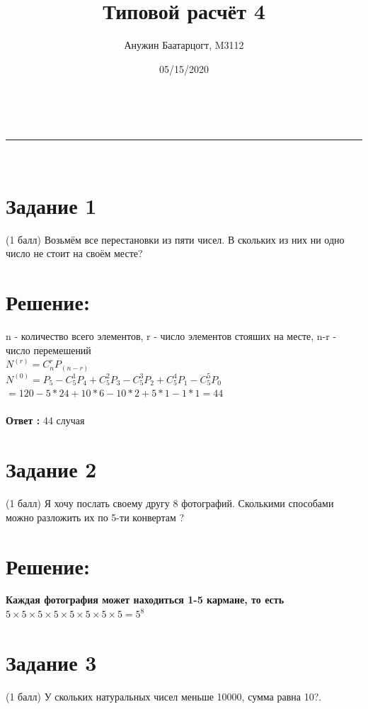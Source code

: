 \documentclass[a4paper,11pt]{article}
\makeatletter
\newcommand{\linia}{\rule{\linewidth}{0.5pt}}
\theoremstyle{mytheor}
\renewcommand{\maketitle}{
\begin{center}
\vspace{2ex}
{\huge \textsc{\@title}}
\vspace{1ex}
\\
\linia\\
\@author \hfill \@date
\vspace{4ex}
\end{center}
}
\makeatother
\begin{document}
\title{Типовой расчёт \textnumero{} 4}

\author{Анужин Баатарцогт, M3112}

\date{05/15/2020}

\maketitle

\section*{Задание 1}
(1 балл) Возьмём все перестановки из пяти чисел. В скольких из них ни одно число не стоит на своём месте?
\newline
\section*{Решение:}
n - количество всего элементов, r - число элементов стояших на месте, n-r - число перемешений \\
$N^{(r)} = C_n^r  P_(n-r)$  \\
$N^{(0)} = P_5 - C_5^1P_4 + C_5^2P_3 - C_5^3P_2 + C_5^4P_1 - C_5^5P_0$
$ = 120 -5*24 + 10*6 - 10*2 + 5*1 - 1*1 = 44$\\ \\
\textbf{Ответ :} 44 случая\\


\section*{Задание 2}

(1 балл) Я хочу послать своему другу 8 фотографий. Сколькими способами можно разложить их по 5-ти конвертам ?
\newline
\section*{Решение:}
\textbf{Каждая фотография может находиться 1-5 кармане, то есть} \\
\textbf{$5 \times 5 \times 5 \times 5 \times 5 \times 5 \times 5 \times 5  = 5^8$}

\newline

\section*{Задание 3}
(1 балл) У скольких натуральных чисел меньше 10000, сумма равна 10?.
\end{document}
